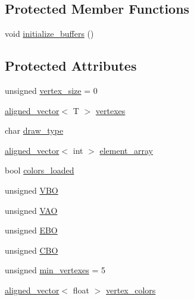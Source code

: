 \subsection*{Protected Member Functions}
\begin{DoxyCompactItemize}
\item 
void \mbox{\hyperlink{classShape_a8b4f54a694871f9d131fdd105e1ca709}{initialize\+\_\+buffers}} ()
\end{DoxyCompactItemize}
\subsection*{Protected Attributes}
\begin{DoxyCompactItemize}
\item 
unsigned \mbox{\hyperlink{classShape_a7cf9cc243cdd64215eca4d81704c7199}{vertex\+\_\+size}} = 0
\item 
\mbox{\hyperlink{type__definitions_8hpp_accb98a876f193a416d9c8a02fe22d526}{aligned\+\_\+vector}}$<$ T $>$ \mbox{\hyperlink{classShape_a50296217cf654fc7b756b67a2f0305c2}{vertexes}}
\item 
char \mbox{\hyperlink{classShape_a851fcb33238286342f670d27443ffdfc}{draw\+\_\+type}}
\item 
\mbox{\hyperlink{type__definitions_8hpp_accb98a876f193a416d9c8a02fe22d526}{aligned\+\_\+vector}}$<$ int $>$ \mbox{\hyperlink{classShape_accef3084e7e3897e01806b90da0a0ec8}{element\+\_\+array}}
\item 
bool \mbox{\hyperlink{classShape_a216866713d16c882a0f0b0b0a89d350d}{colors\+\_\+loaded}}
\item 
unsigned \mbox{\hyperlink{classShape_a5ca89aadcd89bb475d6ca88acf733ce6}{V\+BO}}
\item 
unsigned \mbox{\hyperlink{classShape_a30771567edd66db5d14dc630f2d63f82}{V\+AO}}
\item 
unsigned \mbox{\hyperlink{classShape_a95c775e548b129e23d2dd32e23fb0f3e}{E\+BO}}
\item 
unsigned \mbox{\hyperlink{classShape_a66502f6f87b46a705d131dc7b0b67d42}{C\+BO}}
\item 
unsigned \mbox{\hyperlink{classShape_acb30d3bdd3434dc2cb3074a4d61985ed}{min\+\_\+vertexes}} = 5
\item 
\mbox{\hyperlink{type__definitions_8hpp_accb98a876f193a416d9c8a02fe22d526}{aligned\+\_\+vector}}$<$ float $>$ \mbox{\hyperlink{classShape_a1590ef02d7090f28d1ad312fd46f5030}{vertex\+\_\+colors}}
\end{DoxyCompactItemize}
